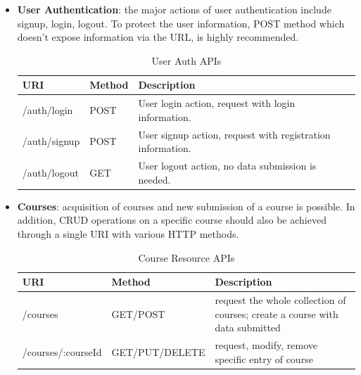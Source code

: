 \begin{itemize}
\item
\textbf{User Authentication}: the major actions of user authentication include signup, login, logout. To protect the user information, POST method which doesn't expose information via the URL, is highly recommended.

\begin{table}[!htbp]
\centering
\begin{tabularx}{\textwidth}{@{}llX@{}}
\toprule
URI          & Method & Description                                                  \\ \midrule
/auth/login  & POST   & User login action, request with login information.           \\
/auth/signup & POST   & User signup action, request with registration information.   \\
/auth/logout & GET    & User logout action, no data submission is needed.            \\ \bottomrule
\end{tabularx}
\caption{User Auth APIs}
\label{table:user-auth-apis}
\end{table}

\item
\textbf{Courses}: acquisition of courses and new submission of a course is possible. In addition, \gls{CRUD} operations on a specific course should also be achieved through a single URI with various HTTP methods.

\begin{table}[!htbp]
\centering

\begin{tabularx}{\textwidth}{@{}llX@{}}
\toprule
URI                 & Method         & Description                                                                                                          \\ \midrule
/courses            & GET/POST       & request the whole collection of courses; create a course with data submitted \\
/courses/:courseId & GET/PUT/DELETE & request, modify, remove specific entry of course                                                                     \\ \bottomrule
\end{tabularx}
\caption{Course Resource APIs}
\label{table:course-resource-apis}
\end{table}


\end{itemize}
